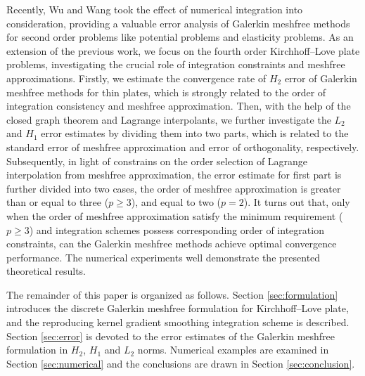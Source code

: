 Recently, Wu and Wang \cite{ref50} took the effect of numerical integration into consideration, providing a valuable error analysis of Galerkin meshfree methods for second order problems like potential problems and elasticity problems.
As an extension of the previous work, we focus on the fourth order Kirchhoff--Love plate problems, investigating the crucial role of integration constraints and meshfree approximations.
Firstly, we estimate the convergence rate of $H_2$ error of Galerkin meshfree methods for thin plates, which is strongly related to the order of integration consistency and meshfree approximation.
Then, with the help of the closed graph theorem \cite{ref51} and Lagrange interpolants, we further investigate the $L_2$ and $H_1$ error estimates by dividing them into two parts, which is related to the standard error of meshfree approximation and error of orthogonality, respectively.
Subsequently, in light of constrains on the order selection of Lagrange interpolation from meshfree approximation, the error estimate for first part is further divided into two cases, the order of meshfree approximation is greater than or equal to three ($p\ge3$), and equal to two ($p=2$).
It turns out that, only when the order of meshfree approximation satisfy the minimum requirement ($p\ge3$) and integration schemes possess corresponding order of integration constraints, can the Galerkin meshfree methods achieve optimal convergence performance.
The numerical experiments well demonstrate the presented theoretical results.

The remainder of this paper is organized as follows.
Section \ref{sec:formulation} introduces the discrete Galerkin meshfree formulation for Kirchhoff--Love plate, and the reproducing kernel gradient smoothing integration scheme is described.
Section \ref{sec:error} is devoted to the error estimates of the Galerkin meshfree formulation in $H_2$, $H_1$ and $L_2$ norms.
Numerical examples are examined in Section \ref{sec:numerical} and the conclusions are drawn in Section \ref{sec:conclusion}.
